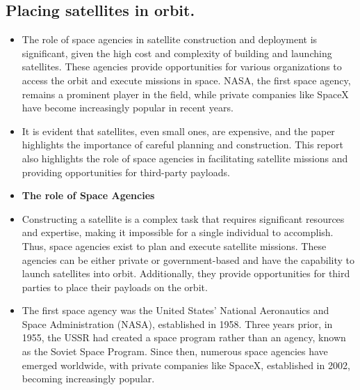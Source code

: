 \documentclass{article}
\begin{document}
    \subsection{Placing satellites in orbit.}
        \begin{itemize}
            \item[] The role of space agencies in satellite construction and deployment is significant, given the high cost and complexity of building and launching satellites. These agencies provide opportunities for various organizations to access the orbit and execute missions in space. NASA, the first space agency, remains a prominent player in the field, while private companies like SpaceX have become increasingly popular in recent years.
            \item[] It is evident\cite{2} that satellites, even small ones, are expensive, and the paper highlights the importance of careful planning and construction. This report also highlights the role of space agencies in facilitating satellite missions and providing opportunities for third-party  payloads.
            \item[] \textbf{The role of Space Agencies}

            \item[] Constructing a satellite is a complex task that requires significant resources and expertise, making it impossible for a single individual to accomplish. Thus, space agencies exist to plan and execute satellite missions. These agencies can be either private or government-based and have the capability to launch satellites into orbit. Additionally, they provide opportunities for third parties to place their payloads on the orbit.
            
            \item[] The first space agency was the United States' National Aeronautics and Space Administration (NASA), established in 1958. Three years prior, in 1955, the USSR had created a space program rather than an agency, known as the Soviet Space Program. Since then, numerous space agencies have emerged worldwide, with private companies like SpaceX, established in 2002, becoming increasingly popular.



        \end{itemize}
\end{document}
